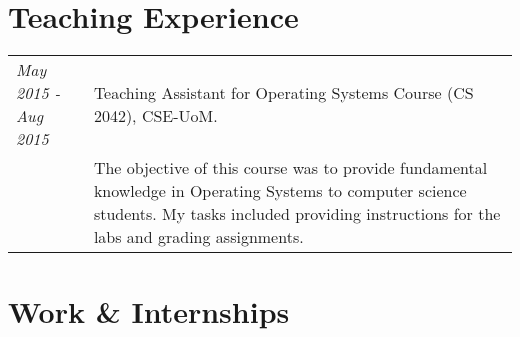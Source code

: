 \documentclass[a4paper,10pt]{article}
\begin{document}
\section{Teaching Experience}
\begin{tabular}{p{3cm}|p{13.5cm}}

\emph{May 2015 - Aug 2015} & Teaching Assistant for Operating Systems Course (CS 2042), CSE-UoM.\\
&\footnotesize{The objective of this course was to provide fundamental knowledge in Operating Systems to computer science students. My tasks included providing instructions for the labs and grading assignments.}
\end{tabular}


\section{Work \& Internships}
\end{document}
